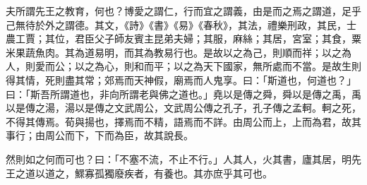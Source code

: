 夫所謂先王之教育，何也？博愛之謂仁，行而宜之謂義，由是而之焉之謂道，足乎己無待於外之謂德。其文，《詩》《書》《易》《春秋》，其法，禮樂刑政，其民，士農工賈；其位，君臣父子師友賓主昆弟夫婦；其服，麻絲；其居，宮室；其食，粟米果蔬魚肉。其為道易明，而其為教易行也。是故以之為己，則順而祥；以之為人，則愛而公；以之為心，則和而平；以之為天下國家，無所處而不當。是故生則得其情，死則盡其常；郊焉而天神假，廟焉而人鬼享。曰：「斯道也，何道也？」曰：「斯吾所謂道也，非向所謂老與佛之道也。」堯以是傳之舜，舜以是傳之禹，禹以是傳之湯，湯以是傳之文武周公，文武周公傳之孔子，孔子傳之孟軻。軻之死，不得其傳焉。荀與揚也，擇焉而不精，語焉而不詳。由周公而上，上而為君，故其事行；由周公而下，下而為臣，故其說長。

然則如之何而可也？曰：「不塞不流，不止不行。」人其人，火其書，廬其居，明先王之道以道之，鰥寡孤獨廢疾者，有養也。其亦庶乎其可也。